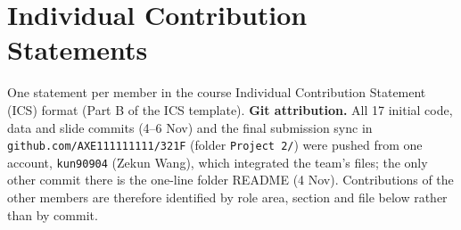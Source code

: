 \documentclass[11pt,a4paper]{article}
\theoremstyle{palplain}
\theoremstyle{paldef}
\theoremstyle{palremark}
\begin{document}

\section{Individual Contribution Statements}\label{app:ics}
\noindent One statement per member in the course Individual Contribution Statement (ICS) format (Part B of the ICS template).
\textbf{Git attribution.} All 17 initial code, data and slide commits (4--6 Nov) and the final submission sync in \texttt{github.com/AXE111111111/321F} (folder \texttt{Project 2/}) were pushed from one account, \texttt{kun90904} (Zekun Wang), which integrated the team's files; the only other commit there is the one-line folder README (4 Nov). Contributions of the other members are therefore identified by role area, section and file below rather than by commit.

\newcommand{\icsform}[7]{%
\begin{formbox}\sloppy\raggedright\setlength{\parindent}{0pt}
\textbf{Individual Contribution Statement --- Project 2 (PDE BVP) --- Member #1}\\[0.4em]
\textbf{Name:} #2 \quad \textbf{Student ID:} #3\\
\textbf{Role this project:} #4

\vspace{0.5em}
\textbf{The specific things I did this project:}
#5

\vspace{0.4em}
\textbf{What I would do differently:}\\
#6

\vspace{0.4em}
\textbf{Anything I should have asked for help with earlier} (optional):\\
#7

\vspace{0.8em}
\textbf{Signature:} \sig{\icskey} \quad \textbf{Date:} 2026-11-13
\end{formbox}
}
\end{document}

